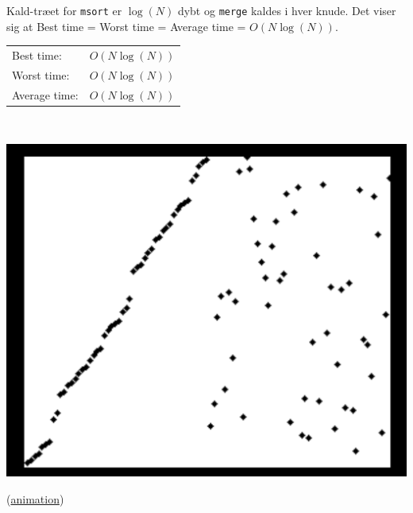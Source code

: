 \documentclass[rgb]{beamer}
\begin{document}
\begin{frame}[fragile]
\begin{footnotesize}

\vspace{1ex}

\begin{minipage}[b]{0.55\textwidth}

  Kald-træet for \lstinline{msort} er $\log(N)$ dybt og
  \lstinline{merge} kaldes i hver knude. Det viser sig at Best time =
  Worst time = Average time = $O(N\log(N))$.

\vspace{1ex}


\vspace{1ex}
  \begin{tabular}{ll}
    Best time: & $O(N\log(N))$ \\
    Worst time: & $O(N\log(N))$ \\
    Average time: & $O(N\log(N))$
  \end{tabular}

  \vfill
\mbox{ }
\end{minipage} \hspace{1cm}
\begin{minipage}[b]{0.3\textwidth}

  \includegraphics[width=\textwidth]{../images/msort_gif.png}

  (\href{https://upload.wikimedia.org/wikipedia/commons/c/c5/Merge_sort_animation2.gif}{animation})
\end{minipage}

\end{footnotesize}
\end{frame}
\end{document}
